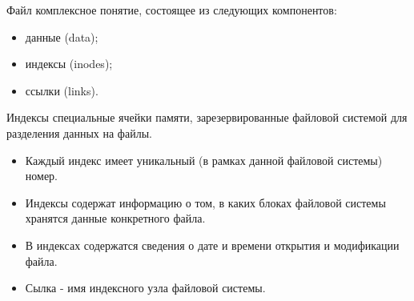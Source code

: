 \documentclass{beamer}
\begin{document}
\begin{frame}
\begin{block}{Файл}
комплексное понятие, состоящее из следующих компонентов:
\begin{itemize}
\item данные (data);
\item индексы (inodes);
\item ссылки (links).
\end{itemize}
\end{block}
\begin{block}{Индексы}
специальные ячейки памяти, зарезервированные файловой системой для разделения данных на файлы. 
\end{block}
\begin{itemize}
\item Каждый индекс имеет уникальный (в рамках данной файловой системы) номер.
\item Индексы содержат информацию о том, в каких блоках файловой системы хранятся данные конкретного файла. 
\item В индексах содержатся сведения о дате и времени открытия и модификации файла. 
\item Сылка - имя индексного узла файловой системы. 
\end{itemize}
\end{frame}


\end{document}
